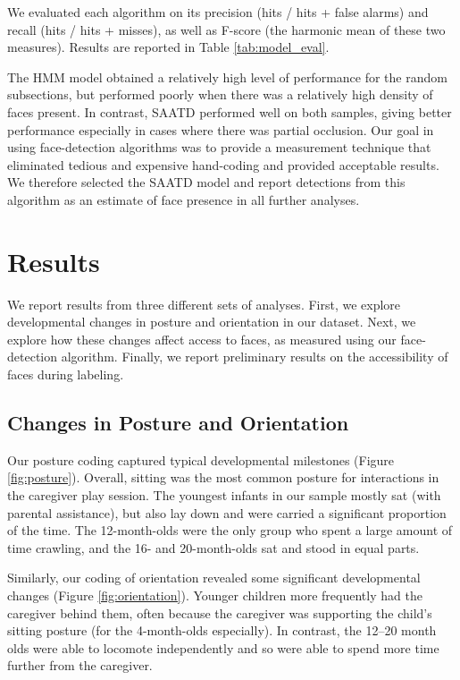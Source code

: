 \documentclass[a4paper,man,apacite,floatsintext,longtable]{apa6}
\begin{document}
We evaluated each algorithm on its precision (hits / hits + false
alarms) and recall (hits / hits + misses), as well as F-score (the
harmonic mean of these two measures). Results are reported in Table
\ref{tab:model_eval}.

The HMM model obtained a relatively high level of performance for the
random subsections, but performed poorly when there was a relatively
high density of faces present. In contrast, SAATD performed well on both
samples, giving better performance especially in cases where there was
partial occlusion. Our goal in using face-detection algorithms was to
provide a measurement technique that eliminated tedious and expensive
hand-coding and provided acceptable results. We therefore selected the
SAATD model and report detections from this algorithm as an estimate of
face presence in all further analyses.

\section{Results}\label{results}

We report results from three different sets of analyses. First, we
explore developmental changes in posture and orientation in our dataset.
Next, we explore how these changes affect access to faces, as measured
using our face-detection algorithm. Finally, we report preliminary
results on the accessibility of faces during labeling.

\subsection{Changes in Posture and
Orientation}\label{changes-in-posture-and-orientation}

Our posture coding captured typical developmental milestones (Figure
\ref{fig:posture}). Overall, sitting was the most common posture for
interactions in the caregiver play session. The youngest infants in our
sample mostly sat (with parental assistance), but also lay down and were
carried a significant proportion of the time. The 12-month-olds were the
only group who spent a large amount of time crawling, and the 16- and
20-month-olds sat and stood in equal parts.

Similarly, our coding of orientation revealed some significant
developmental changes (Figure \ref{fig:orientation}). Younger children
more frequently had the caregiver behind them, often because the
caregiver was supporting the child's sitting posture (for the
4-month-olds especially). In contrast, the 12--20 month olds were able
to locomote independently and so were able to spend more time further
from the caregiver.
\end{document}
